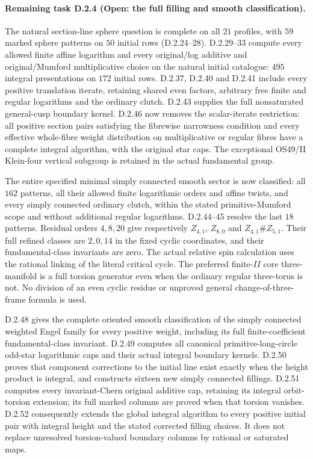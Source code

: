 \paragraph{Remaining task D.2.4 (Open: the full filling and smooth classification).}
The natural section-line sphere question is complete on all $21$
profiles, with $59$ marked sphere patterns on $50$ initial rows
(D.2.24--28). D.2.29--33 compute every allowed finite affine
logarithm and every original/log additive and original/Mumford
multiplicative choice on the natural initial catalogue: $495$
integral presentations on $172$ initial rows. D.2.37, D.2.40 and
D.2.41 include every positive translation iterate, retaining shared
even factors, arbitrary free finite and regular logarithms and the
ordinary clutch. D.2.43 supplies the full nonsaturated general-cusp
boundary kernel. D.2.46 now removes the scalar-iterate restriction:
all positive section pairs satisfying the fibrewise narrowness
condition and every effective whole-fibre weight distribution on
multiplicative or regular fibres have a complete integral algorithm,
with the original star caps. The exceptional OS49/II Klein-four
vertical subgroup is retained in the actual fundamental group.

The entire specified minimal simply connected smooth sector is now
classified: all $162$ patterns, all their allowed finite logarithmic
orders and affine twists, and every simply connected ordinary clutch,
within the stated primitive-Mumford scope and without additional
regular logarithms. D.2.44--45 resolve the last $18$ patterns.
Residual orders $4,8,20$ give respectively
$Z_{4,1}$, $Z_{8,0}$ and $Z_{4,1}\#Z_{5,1}$.
Their full refined classes are $2,0,14$ in the fixed cyclic
coordinates, and their fundamental-class invariants are zero.
The actual relative spin calculation uses the rational linking of
the literal critical cycle. The preferred finite-$II$ core
three-manifold is a full torsion generator even when the ordinary
regular three-torus is not. No division of an even cyclic residue
or unproved general change-of-three-frame formula is used.

D.2.48 gives the complete oriented smooth classification of the
simply connected weighted Engel family for every positive weight,
including its full finite-coefficient fundamental-class invariant.
D.2.49 computes all canonical primitive-long-circle odd-star
logarithmic caps and their actual integral boundary kernels.
D.2.50 proves that component corrections to the initial line exist
exactly when the height product is integral, and constructs sixteen
new simply connected fillings. D.2.51 computes every invariant-Chern
original additive cap, retaining its integral orbit-torsion extension;
its full marked columns are proved when that torsion vanishes.
D.2.52 consequently extends the global integral algorithm to every
positive initial pair with integral height and the stated corrected
filling choices. It does not replace unresolved torsion-valued
boundary columns by rational or saturated maps.

